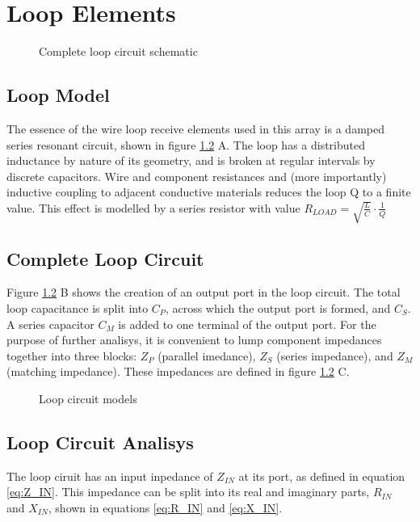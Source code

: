 \chapter{Loop Elements}

\begin{figure}
    \centering
    
    \caption{Complete loop circuit schematic}
    \label{fig:loop_schematic}
\end{figure}

\section{Loop Model}
The essence of the wire loop receive elements used in this array is a damped series resonant circuit, shown in figure
\ref{fig:loop_model} A. The loop has a distributed inductance by nature of its geometry, and is broken at regular
intervals by discrete capacitors.  Wire and component resistances and (more importantly) inductive coupling to adjacent
conductive materials reduces the loop Q to a finite value. This effect is modelled by a series resistor with value
$R_{LOAD}=\sqrt{\frac{L}{C}}\cdot\frac{1}{Q}$

\section{Complete Loop Circuit}
Figure \ref{fig:loop_model} B shows the creation of an output port in the loop circuit. The total loop capacitance is split into $C_P$, 
across which the output port is formed, and $C_S$. A series capacitor $C_M$ is added to one terminal of the output port.
For the purpose of further analisys, it is convenient to lump component impedances together into three blocks: $Z_P$ (parallel
imedance), $Z_S$ (series impedance), and $Z_M$ (matching impedance). These impedances are defined in figure \ref{fig:loop_model} C.

\begin{figure}
    \centering
    
    \caption{Loop circuit models}
    \label{fig:loop_model}
\end{figure}

\section{Loop Circuit Analisys}
The loop ciruit has an input inpedance of $Z_{IN}$ at its port, as defined in equation \ref{eq:Z_IN}. This impedance can
be split into its real and imaginary parts, $R_{IN}$ and $X_{IN}$, shown in equations \ref{eq:R_IN} and \ref{eq:X_IN}.

